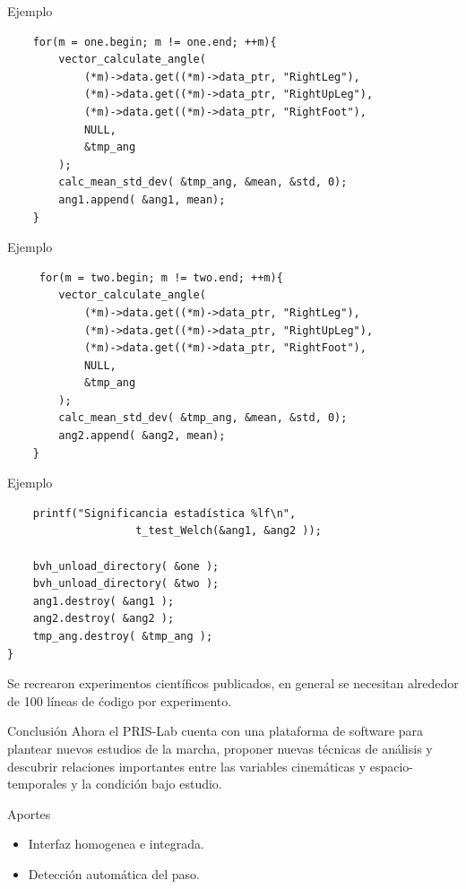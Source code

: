 \documentclass[aspectratio=169,spanish]{beamer} %
\begin{document}
\begin{frame}[fragile]{Ejemplo}
    \begin{verbatim}
    for(m = one.begin; m != one.end; ++m){
        vector_calculate_angle( 
            (*m)->data.get((*m)->data_ptr, "RightLeg"), 
            (*m)->data.get((*m)->data_ptr, "RightUpLeg"),
            (*m)->data.get((*m)->data_ptr, "RightFoot"),
            NULL,
            &tmp_ang
        );
        calc_mean_std_dev( &tmp_ang, &mean, &std, 0);
        ang1.append( &ang1, mean);
    }
\end{verbatim}
\end{frame}

\begin{frame}[fragile]{Ejemplo}
\begin{verbatim}
     for(m = two.begin; m != two.end; ++m){
        vector_calculate_angle( 
            (*m)->data.get((*m)->data_ptr, "RightLeg"), 
            (*m)->data.get((*m)->data_ptr, "RightUpLeg"),
            (*m)->data.get((*m)->data_ptr, "RightFoot"),
            NULL,
            &tmp_ang
        );
        calc_mean_std_dev( &tmp_ang, &mean, &std, 0);
        ang2.append( &ang2, mean);
    }
\end{verbatim}
\end{frame}

\begin{frame}[fragile]{Ejemplo}
\begin{verbatim}
    printf("Significancia estadística %lf\n", 
                    t_test_Welch(&ang1, &ang2 ));

    bvh_unload_directory( &one );
    bvh_unload_directory( &two );
    ang1.destroy( &ang1 );
    ang2.destroy( &ang2 );
    tmp_ang.destroy( &tmp_ang );
}
\end{verbatim}
\begin{block}{}
    Se recrearon experimentos científicos publicados, en general se necesitan alrededor de 100 líneas de ćodigo por experimento. 
\end{block}
\end{frame}

\begin{frame}{Conclusión}
    Ahora el PRIS-Lab cuenta con una plataforma de software para plantear nuevos estudios de la marcha, proponer nuevas técnicas de análisis y descubrir relaciones importantes entre las variables cinemáticas y espacio-temporales y la condición bajo estudio.  
    \begin{block}{Aportes}
        \begin{itemize}
            \item Interfaz homogenea e integrada. 
            \item Detección automática del paso. 
        \end{itemize}
    \end{block}
\end{frame}
\end{document}
